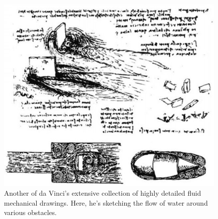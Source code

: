 \documentclass[11pt]{article}
\begin{document}
\begin{figure}[!htb]
	\centering
	\includegraphics[scale=0.5]{davinci_1}
	\caption{Another of da Vinci's extensive collection of highly detailed fluid mechanical drawings. Here, he's sketching the flow of water around various obstacles.}
	\label{fig:davinci1}
\end{figure} 

  
\end{document}
